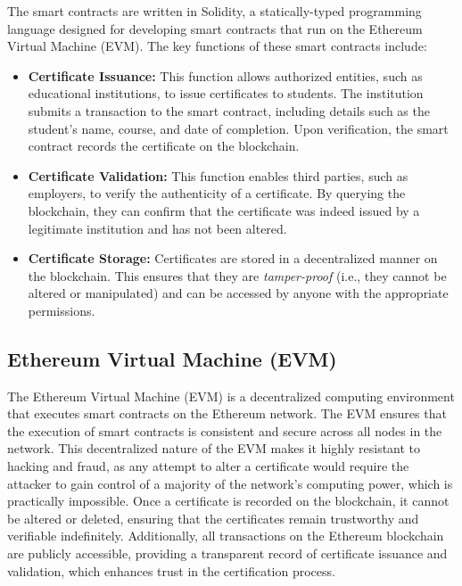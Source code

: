 The smart contracts are written in Solidity, a statically-typed programming language designed for developing smart contracts that run on the Ethereum Virtual Machine (EVM). The key functions of these smart contracts include:

\begin{itemize}
    \item \textbf{Certificate Issuance:} This function allows authorized entities, such as educational institutions, to issue certificates to students. The institution submits a transaction to the smart contract, including details such as the student’s name, course, and date of completion. Upon verification, the smart contract records the certificate on the blockchain.

    \item \textbf{Certificate Validation:} This function enables third parties, such as employers, to verify the authenticity of a certificate. By querying the blockchain, they can confirm that the certificate was indeed issued by a legitimate institution and has not been altered.

    \item \textbf{Certificate Storage:} Certificates are stored in a decentralized manner on the blockchain. This ensures that they are \textit{tamper-proof} (i.e., they cannot be altered or manipulated) and can be accessed by anyone with the appropriate permissions.

\end{itemize}

\subsection{Ethereum Virtual Machine (EVM)}

The Ethereum Virtual Machine (EVM) is a decentralized computing environment that executes smart contracts on the Ethereum network. The EVM ensures that the execution of smart contracts is consistent and secure across all nodes in the network\cite{EVM}. This decentralized nature of the EVM makes it highly resistant to hacking and fraud, as any attempt to alter a certificate would require the attacker to gain control of a majority of the network’s computing power, which is practically impossible. Once a certificate is recorded on the blockchain, it cannot be altered or deleted, ensuring that the certificates remain trustworthy and verifiable indefinitely. Additionally, all transactions on the Ethereum blockchain are publicly accessible, providing a transparent record of certificate issuance and validation, which enhances trust in the certification process.


